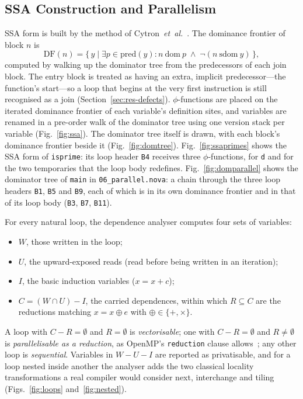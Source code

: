 \documentclass[conference]{IEEEtran}
\newcommand{\code}[1]{\texttt{#1}}
\begin{document}
\subsection{SSA Construction and Parallelism}
SSA form is built by the method of Cytron~\emph{et~al.}~\cite{cytron1991}. The dominance frontier of block $n$ is
\begin{equation}
\mathrm{DF}(n)=\{\,y \mid \exists p\in\mathrm{pred}(y): n~\mathrm{dom}~p \;\wedge\; \neg(n~\mathrm{sdom}~y)\,\},
\label{eq:df}
\end{equation}
computed by walking up the dominator tree from the predecessors of each join block. The entry block is treated as having an extra, implicit predecessor---the function's start---so a loop that begins at the very first instruction is still recognised as a join (Section~\ref{sec:res-defects}). $\phi$-functions are placed on the iterated dominance frontier of each variable's definition sites, and variables are renamed in a pre-order walk of the dominator tree using one version stack per variable (Fig.~\ref{fig:ssa}). The dominator tree itself is drawn, with each block's dominance frontier beside it (Fig.~\ref{fig:domtree}). Fig.~\ref{fig:ssaprimes} shows the SSA form of \code{isprime}: its loop header \code{B4} receives three $\phi$-functions, for \code{d} and for the two temporaries that the loop body redefines. Fig.~\ref{fig:domparallel} shows the dominator tree of \code{main} in \code{06\_parallel.nova}: a chain through the three loop headers \code{B1}, \code{B5} and \code{B9}, each of which is in its own dominance frontier and in that of its loop body (\code{B3}, \code{B7}, \code{B11}).

For every natural loop, the dependence analyser computes four sets of variables:
\begin{itemize}
\item $W$, those written in the loop;
\item $U$, the upward-exposed reads (read before being written in an iteration);
\item $I$, the basic induction variables ($x = x + c$);
\item $C = (W \cap U) - I$, the carried dependences, within which $R \subseteq C$ are the reductions matching $x = x \oplus e$ with $\oplus\in\{+,\times\}$.
\end{itemize}
A loop with $C - R = \emptyset$ and $R = \emptyset$ is \emph{vectorisable}; one with $C - R = \emptyset$ and $R \neq \emptyset$ is \emph{parallelisable as a reduction}, as OpenMP's \code{reduction} clause allows~\cite{openmp2021}; any other loop is \emph{sequential}. Variables in $W - U - I$ are reported as privatisable, and for a loop nested inside another the analyser adds the two classical locality transformations a real compiler would consider next, interchange and tiling (Figs.~\ref{fig:loops} and~\ref{fig:nested}).
\end{document}
